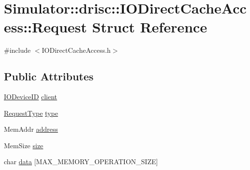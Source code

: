 \hypertarget{struct_simulator_1_1drisc_1_1_i_o_direct_cache_access_1_1_request}{\section{Simulator\+:\+:drisc\+:\+:I\+O\+Direct\+Cache\+Access\+:\+:Request Struct Reference}
\label{struct_simulator_1_1drisc_1_1_i_o_direct_cache_access_1_1_request}
}


{\ttfamily \#include $<$I\+O\+Direct\+Cache\+Access.\+h$>$}

\subsection*{Public Attributes}
\begin{DoxyCompactItemize}
\item 
\hyperlink{namespace_simulator_a3493d987c866ad6b8aaa704c42502db0}{I\+O\+Device\+I\+D} \hyperlink{struct_simulator_1_1drisc_1_1_i_o_direct_cache_access_1_1_request_af0bfc6592e7f2d2ff1fd87a54a076b4d}{client}
\item 
\hyperlink{class_simulator_1_1drisc_1_1_i_o_direct_cache_access_ab3755016dcd264261b50c8e4aa274c1c}{Request\+Type} \hyperlink{struct_simulator_1_1drisc_1_1_i_o_direct_cache_access_1_1_request_a5b6b7266074ea1c9c4426813acfcdd3f}{type}
\item 
Mem\+Addr \hyperlink{struct_simulator_1_1drisc_1_1_i_o_direct_cache_access_1_1_request_a7e256322f3eb78d624ec38caeb54b8dc}{address}
\item 
Mem\+Size \hyperlink{struct_simulator_1_1drisc_1_1_i_o_direct_cache_access_1_1_request_a246ec47aa3c55c3628503e389f568aee}{size}
\item 
char \hyperlink{struct_simulator_1_1drisc_1_1_i_o_direct_cache_access_1_1_request_ae49c9dcc14296d0ab368cce5b0adbda5}{data} \mbox{[}M\+A\+X\+\_\+\+M\+E\+M\+O\+R\+Y\+\_\+\+O\+P\+E\+R\+A\+T\+I\+O\+N\+\_\+\+S\+I\+Z\+E\mbox{]}
\end{DoxyCompactItemize}


